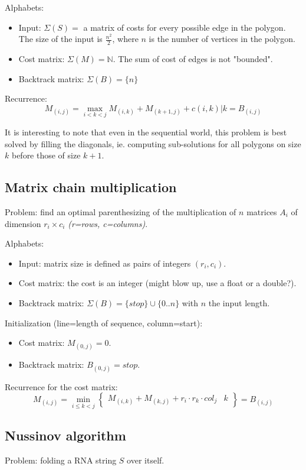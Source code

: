 \documentclass[11pt]{article}
\def\ul{\begin{itemize}}
\def\ule{\end{itemize}}
\begin{document}
Alphabets:\ul
\item Input: $\Sigma(S)= $ a matrix of costs for every possible edge in the polygon. The 
size of the input is $\frac{n^2}{2}$, where $n$ is the number of vertices in the polygon. 
\item Cost matrix: $\Sigma(M)=\mathbb{N}$. The sum of cost of edges is not "bounded".
\item Backtrack matrix: $\Sigma(B)=\{n\}$
\ule

Recurrence:
\[M_{(i,j)}= \max_{i<k<j}M_{(i,k)}+M_{(k+1,j)} + c(i,k) | k = B_{(i,j)} \]

It is interesting to note that even in the sequential world, this problem is best solved 
by filling the diagonals, ie. computing sub-solutions for all polygons on size $k$ before
those of size $k+1$.



\newpage
\subsection{Matrix chain multiplication}
Problem: find an optimal parenthesizing of the multiplication of $n$ matrices $A_i$ of dimension $r_i \times c_i$ \textit{(r=rows, c=columns)}. 

Alphabets:\ul
\item Input: matrix size is defined as pairs of integers $(r_i,c_i)$.
\item Cost matrix: the cost is an integer (might blow up, use a float or a double?).
\item Backtrack matrix: $\Sigma(B)=\{stop\} \cup \{0..n\}$ with $n$ the input length.
\ule

Initialization (line=length of sequence, column=start):\ul
\item Cost matrix: $M_{(0,j)}=0$.
\item Backtrack matrix: $B_{(0,j)}=stop$.
\ule

Recurrence for the cost matrix:
\[M_{(i,j)}=\min_{i\le k<j}\left\{\begin{array}{l|l}
	M_{(i,k)}+M_{(k,j)}+r_i \cdot r_k \cdot col_j & k
\end{array}\right\}=B_{(i,j)} \]

\subsection{Nussinov algorithm}
Problem: folding a RNA string $S$ over itself.
\end{document}
